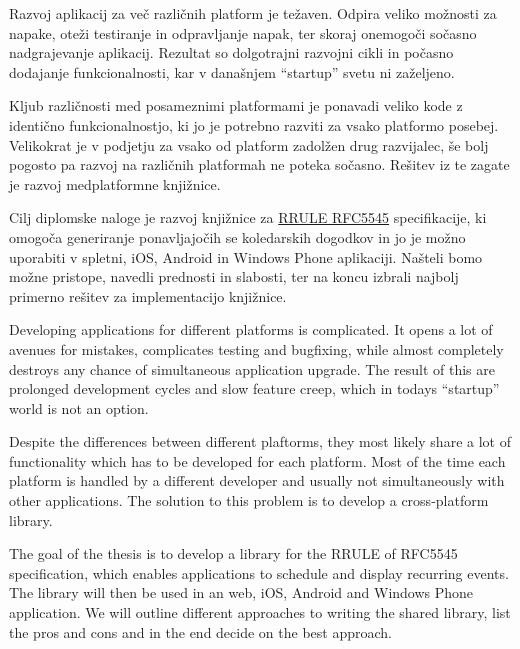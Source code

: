 








\begin{Povzetek}

Razvoj aplikacij za več različnih platform je težaven. Odpira veliko možnosti za napake, oteži testiranje in odpravljanje napak, ter skoraj onemogoči sočasno nadgrajevanje aplikacij. Rezultat so dolgotrajni razvojni cikli in počasno dodajanje funkcionalnosti, kar v današnjem ``startup'' svetu ni zaželjeno.

Kljub različnosti med posameznimi platformami je ponavadi veliko kode z identično funkcionalnostjo, ki jo je potrebno razviti za vsako platformo posebej. Velikokrat je v podjetju za vsako od platform zadolžen drug razvijalec, še bolj pogosto pa razvoj na različnih platformah ne poteka sočasno. Rešitev iz te zagate je razvoj medplatformne knjižnice.

Cilj diplomske naloge je razvoj knjižnice za \href{http://tools.ietf.org/html/rfc5545#section-3.3.10}{RRULE RFC5545} specifikacije, ki omogoča generiranje ponavljajočih se koledarskih dogodkov in jo je možno uporabiti v spletni, iOS, Android in Windows Phone aplikaciji. Našteli bomo možne pristope, navedli prednosti in slabosti, ter na koncu izbrali najbolj primerno rešitev za implementacijo knjižnice.
\end{Povzetek}









\begin{Abstract}

Developing applications for different platforms is complicated. It opens a lot of avenues for mistakes, complicates testing and bugfixing, while almost completely destroys any chance of simultaneous application upgrade. The result of this are prolonged development cycles and slow feature creep, which in todays ``startup'' world is not an option.

Despite the differences between different plaftorms, they most likely share a lot of functionality which has to be developed for each platform. Most of the time each platform is handled by a different developer and usually not simultaneously with other applications. The solution to this problem is to develop a cross-platform library.

The goal of the thesis is to develop a library for the RRULE of RFC5545 specification, which enables applications to schedule and display recurring events. The library will then be used in an web, iOS, Android and Windows Phone application. We will outline different approaches to writing the shared library, list the pros and cons and in the end decide on the best approach.
\end{Abstract}
